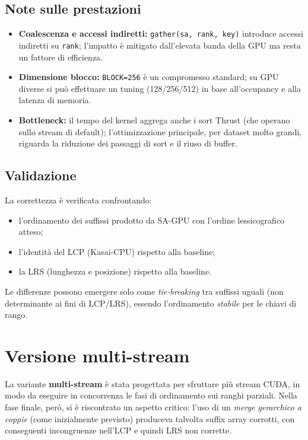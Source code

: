 		\subsection{Note sulle prestazioni}
			\begin{itemize}
				\item \textbf{Coalescenza e accessi indiretti:} \texttt{gather(sa, rank, key)} introduce accessi indiretti su \texttt{rank}; l'impatto è mitigato dall'elevata banda della GPU ma resta un fattore di efficienza.
				\item \textbf{Dimensione blocco:} \texttt{BLOCK=256} è un compromesso standard; su GPU diverse si può effettuare un tuning (128/256/512) in base all'occupancy e alla latenza di memoria.
				\item \textbf{Bottleneck:} il tempo del kernel aggrega anche i sort Thrust (che operano sullo stream di default); l’ottimizzazione principale, per dataset molto grandi, riguarda la riduzione dei passaggi di sort e il riuso di buffer.
			\end{itemize}
		
		\subsection{Validazione}
			La correttezza è verificata confrontando:
			\begin{itemize}
				\item l’ordinamento dei suffissi prodotto da SA-GPU con l’ordine lessicografico atteso;
				\item l'identità del LCP (Kasai-CPU) rispetto alla baseline;
				\item la LRS (lunghezza e posizione) rispetto alla baseline.
			\end{itemize}
			Le differenze possono emergere solo come \emph{tie-breaking} tra suffissi uguali (non determinante ai fini di LCP/LRS), essendo l'ordinamento \emph{stabile} per le chiavi di rango.
	
	\section{Versione multi-stream}
		
		La variante \textbf{multi-stream} è stata progettata per sfruttare più stream CUDA, in modo da eseguire in concorrenza le fasi di ordinamento sui ranghi parziali. Nella fase finale, però, si è riscontrato un aspetto critico: l’uso di un \emph{merge gerarchico a coppie} (come inizialmente previsto) produceva talvolta suffix array corrotti, con conseguenti incongruenze nell’LCP e quindi LRS non corrette.
		
